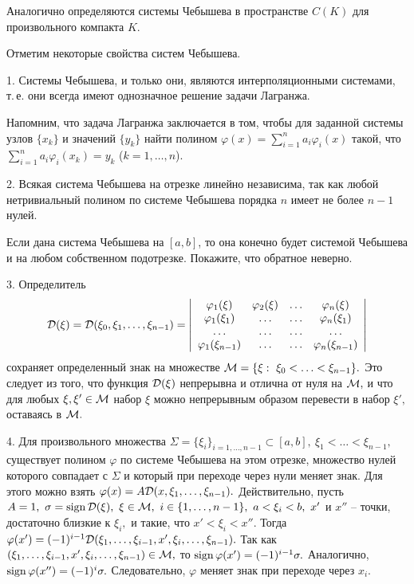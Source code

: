 Аналогично определяются системы Чебышева в пространстве $C(K)$ для
произвольного компакта $K$.

Отметим некоторые свойства систем Чебышева.

1. Системы Чебышева, и только они, являются интерполяционными системами,
т.\,е. они всегда имеют однозначное решение задачи Лагранжа.

Напомним, что задача Лагранжа заключается в том, чтобы для заданной системы
узлов $\{x_k\}$ и значений $\{y_k\}$ найти полином
$\varphi(x)=\sum\limits_{i=1}^n a_i \varphi_i(x)$ такой, что
$\sum\limits_{i=1}^n a_i \varphi_i(x_k)=y_k$ ($k=1,\ldots,n$).

2. Всякая система Чебышева на отрезке линейно независима, так как
любой нетривиальный полином по системе Чебышева порядка $n$ имеет не более
$n-1$ нулей.

\begin{ex}
Если дана система Чебышева на $[a,b]$, то она конечно будет системой Чебышева
и на любом собственном подотрезке. Покажите, что обратное неверно.
\end{ex}

3. Определитель
$$
{\cal D}(\xi)={\cal D}(\xi_0,\xi_1,\ldots,\xi_{n-1})=\left|
\begin{array}{cccc}
\varphi_1(\xi) &  \varphi_2(\xi) & \ldots &  \varphi_n(\xi)\\
\varphi_1(\xi_1) & \ldots  & \ldots &  \varphi_n(\xi_1)\\
\ldots & \ldots & \ldots & \ldots\\
\varphi_1(\xi_{n-1}) &  \ldots & \ldots &  \varphi_n(\xi_{n-1})
\end{array}
\right|
$$
сохраняет определенный знак на множестве ${\cal M}=\{\xi:\ \xi_0<\ldots<\xi_{n-1}\}.$
Это следует из того, что функция ${\cal D}(\xi)$ непрерывна и отлична от нуля
на ${\cal M},$ и что для любых $\xi,\xi'\in {\cal M}$
набор $\xi$ можно непрерывным образом перевести в набор $\xi',$
оставаясь в ${\cal M}.$

4. Для произвольного множества $\Sigma=\{\xi_i\}_{i=1,\ldots,n-1}\subset [a,b],\
\xi_1<\ldots<\xi_{n-1},$ существует полином $\varphi$ по
системе Чебышева на этом отрезке, множество
нулей которого совпадает с $\Sigma$ и который при переходе
через нули меняет знак. Для этого можно взять $\varphi(x)=A{\cal
D}(x,\xi_1,\ldots,\xi_{n-1}).$ Действительно, пусть $A=1,\
\sigma={\rm sign \, } {\cal D}(\xi),\ \xi\in {\cal M},\ i\in \{1,\ldots,n-1\},\
a<\xi_i<b,\ x'$ и $x''$ -- точки, достаточно близкие к $\xi_i,$ и такие,
что $x'<\xi_i<x''.$ Тогда $\varphi(x')=(-1)^{i-1}{\cal D}(\xi_1,\ldots,\xi_{i-1},x',\xi_i,
\ldots,\xi_{n-1}).$ Так как $(\xi_1,\ldots,\xi_{i-1},x',\xi_i,\ldots,\xi_{n-1})\in {\cal
M},$ то ${\rm sign \, }\varphi(x')=(-1)^{i-1}\sigma.$ Аналогично, ${\rm sign \, }\varphi(x'')=(-1)^{i}\sigma.$
Следовательно, $\varphi$ меняет знак при переходе через $x_i.$

